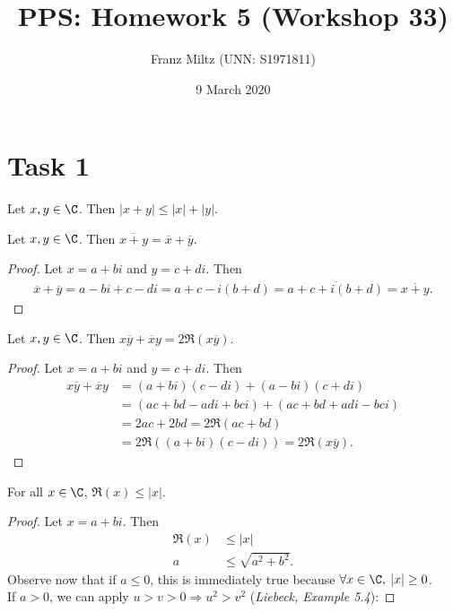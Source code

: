 \documentclass{article}
\title{PPS: Homework 5 (Workshop 33)}
\author{Franz Miltz (UNN: S1971811)}
\date{9 March 2020}
\begin{document}
\maketitle
\section*{Task 1}
\begin{claim}
  Let $x,y\in\C$. Then $|x+y|\leq |x|+|y|$.
\end{claim}
\begin{adjustwidth}{2em}{0pt}
  \begin{lemma}
    \label{l1}
    Let $x,y\in\C$. Then $\overline{x+y}=\overline{x}+\overline{y}$.
  \end{lemma}
  \begin{proof}
    Let $x=a+bi$ and $y=c+di$. Then
    \begin{align*}
      \overline{x}+\overline{y}=a-bi+c-di=a+c-i(b+d)=\overline{a+c+i(b+d)}=\overline{x+y}.
    \end{align*}
  \end{proof}
  \begin{lemma}
    \label{l2}
    Let $x,y\in\C$. Then $x\overline{y}+\overline{x}y=2\Re({x\overline{y}})$.
  \end{lemma}
  \begin{proof}
    Let $x=a+bi$ and $y=c+di$. Then
    \begin{align*}
      x\overline{y}+\overline{x}y & =(a+bi)(c-di)+(a-bi)(c+di)           \\
                          & =(ac+bd-adi+bci)+(ac+bd+adi-bci)     \\
                          & =2ac+2bd=2\Re(ac+bd)                 \\
                          & =2\Re((a+bi)(c-di))=2\Re(x\overline{y}).
    \end{align*}
  \end{proof}
  \begin{lemma}
    \label{l3}
    For all $x\in\C$, $\Re(x)\leq|x|$.
  \end{lemma}
  \begin{proof}
    Let $x=a+bi$. Then
    \begin{align*}
      \Re(x) & \leq|x|              \\
      a      & \leq \sqrt{a^2+b^2}.
    \end{align*}
    Observe now that if $a\leq0$, this is immediately true because $\forall x\in\C,\:|x|\geq 0$.\\
    If $a>0$, we can apply $u>v>0\Rightarrow u^2>v^2$ (\emph{Liebeck, Example 5.4}):

\end{proof}
\end{adjustwidth}
\end{document}
